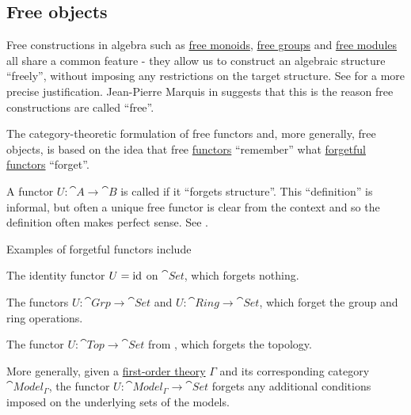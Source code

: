 \subsection{Free objects}\label{subsec:free_objects}

\begin{remark}\label{rem:free_construction_etymology}
  Free constructions in algebra such as \hyperref[def:free_monoid]{free monoids}, \hyperref[def:free_group]{free groups} and \hyperref[def:free_left_module]{free modules} all share a common feature - they allow us to construct an algebraic structure \enquote{freely}, without imposing any restrictions on the target structure. See  for a more precise justification. Jean-Pierre Marquis in \cite{StanfordPlato:category_theory} suggests that this is the reason free constructions are called \enquote{free}.

  The category-theoretic formulation of free functors and, more generally, free objects, is based on the idea that free \hyperref[def:free_functor]{functors} \enquote{remember} what \hyperref[def:forgetful_functor]{forgetful functors} \enquote{forget}.
\end{remark}

\begin{definition}\label{def:forgetful_functor}\mcite\cite[exmpl. 1.2.3]{Leinster2014}
  A functor \( U: \cat{A} \to \cat{B} \) is called  if it \enquote{forgets structure}. This \enquote{definition} is informal, but often a unique free functor is clear from the context and so the definition often makes perfect sense. See .
\end{definition}

\begin{example}\label{ex:forgetful_functors}
  Examples of forgetful functors include

  \begin{thmenum}
    \item The identity functor \( U = \operatorname{id} \) on \( \cat{Set} \), which forgets nothing.
    \item The functors \( U: \cat{Grp} \to \cat{Set} \) and \( U: \cat{Ring} \to \cat{Set} \), which forget the group and ring operations.
    \item The functor \( U: \cat{Top} \to \cat{Set} \) from , which forgets the topology.
    \item More generally, given a \hyperref[def:first_order_theory]{first-order theory} \( \Gamma \) and its corresponding category \( \cat{Model}_\Gamma \), the functor \( U: \cat{Model}_\Gamma \to \cat{Set} \) forgets any additional conditions imposed on the underlying sets of the models.
  \end{thmenum}
\end{example}

